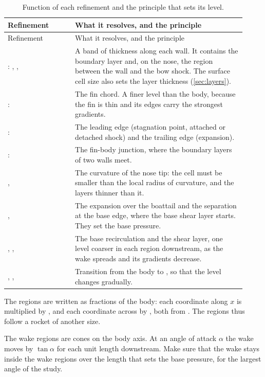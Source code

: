 \begin{longtable}{@{}P{0.26\linewidth} P{0.66\linewidth}@{}}
\caption{Function of each refinement and the principle that sets its level.}\label{tab:regions}\\
\toprule
Refinement & What it resolves, and the principle \\
\midrule
\endfirsthead
\toprule
Refinement & What it resolves, and the principle \\
\midrule
\endhead
{}: , ,  & A band of thickness  along each wall. It contains the boundary layer and, on the nose, the region between the wall and the bow shock. The surface cell size also sets the layer thickness (\cref{sec:layers}). \\
:  & The fin chord. A finer level than the body, because the fin is thin and its edges carry the strongest gradients. \\
:  & The leading edge (stagnation point, attached or detached shock) and the trailing edge (expansion). \\
:  & The fin-body junction, where the boundary layers of two walls meet. \\
,  & The curvature of the nose tip: the cell must be smaller than the local radius of curvature, and the layers thinner than it. \\
,  & The expansion over the boattail and the separation at the base edge, where the base shear layer starts. They set the base pressure. \\
, ,  & The base recirculation and the shear layer, one level coarser in each region downstream, as the wake spreads and its gradients decrease. \\
, ,  & Transition from the body to , so that the level changes gradually. \\
\bottomrule
\end{longtable}

The regions are written as fractions of the body: each coordinate along $x$ is
multiplied by , and each coordinate across by , both from
. The regions thus follow a rocket of another size.

The wake regions are cones on the body axis. At an angle of attack $\alpha$ the wake
moves by $\tan\alpha$ for each unit length downstream. Make sure that the wake stays
inside the wake regions over the length that sets the base pressure, for the largest
angle of the study.

